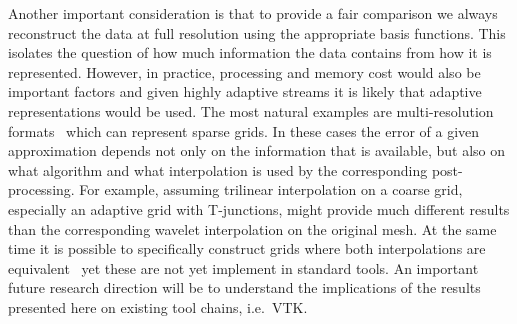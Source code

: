 Another important consideration is that to provide a fair comparison we always reconstruct the data
at full resolution using the appropriate basis functions. This isolates the question of how much
information the data contains from how it is represented. However, in practice, processing and
memory cost would also be important factors and given highly adaptive streams it is likely that
adaptive representations would be used. The most natural examples are multi-resolution
formats~\cite{gigavoxels,Gobbetti2008,vdb2013} which can represent sparse grids. In these cases the
error of a given approximation depends not only on the information that is available, but also on
what algorithm and what interpolation is used by the corresponding post-processing. For example,
assuming trilinear interpolation on a coarse grid, especially an adaptive grid with T-junctions,
might provide much different results than the corresponding wavelet interpolation on the original
mesh. At the same time it is possible to specifically construct grids where both interpolations are
equivalent~\cite{weiss} yet these are not yet implement in standard tools. An important future
research direction will be to understand the implications of the results presented here on existing
tool chains, i.e.\ VTK. 



